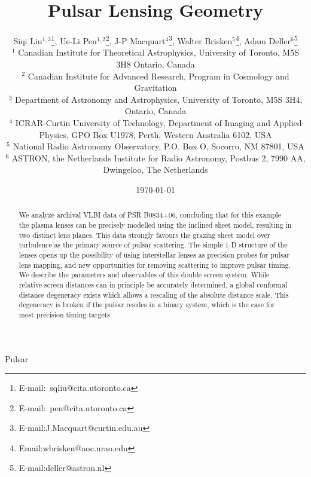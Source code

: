\documentclass[useAMS,usenatbib]{mn2e}
\begin{document}
\title[Lensing Geometry]{
Pulsar Lensing Geometry
}

\author[Liu et al]{Siqi Liu$^{1,3}$\thanks{E-mail:\ sqliu@cita.utoronto.ca}, Ue-Li
  Pen$^{1,2}$\thanks{E-mail:\ pen@cita.utoronto.ca}, J-P Macquart$^{4}$\thanks{E-mail:J.Macquart@curtin.edu.au},
  Walter Brisken$^{5}$\thanks{Email:wbrisken@aoc.nrao.edu}, Adam Deller$^{6}$\thanks{E-mail:deller@astron.nl}\\
 $^1$ Canadian Institute for Theoretical Astrophysics, University of Toronto, M5S 3H8 Ontario, Canada \\
$^2$ Canadian Institute for Advanced Research, Program in Cosmology
and Gravitation\\
$^3$ Department of Astronomy and Astrophysics, University of Toronto, M5S 3H4, Ontario, Canada\\
$^4$ ICRAR-Curtin University of Technology, Department of Imaging and Applied Physics, GPO Box U1978, Perth, Western Australia 6102, USA \\
$^5$ National Radio Astronomy Observatory, P.O. Box O, Socorro, NM 87801, USA\\
$^6$ ASTRON, the Netherlands Institute for Radio Astronomy, Postbus 2, 7990 AA, Dwingeloo, The Netherlands\\
}

\date{\today}

\pagerange{\pageref{firstpage}--\pageref{lastpage}} 

\maketitle
\label{firstpage}
\begin{abstract}
We analyze archival VLBI data of PSR
B0834+06, concluding that for this example the plasma lenses can be
precisely modelled using the \citep{2014MNRAS.442.3338P} inclined sheet model,
resulting in two distinct lens planes.  This data strongly favours the
grazing sheet model over turbulence as the primary source of
pulsar scattering.  The simple 1-D structure of the lenses opens up
the possibility of using interstellar lenses as precision probes for
pulsar lens mapping, and new opportunities for removing scattering to
improve pulsar timing.
We describe the parameters and observables of this double screen
system.  While relative screen distances can in principle be
accurately determined,
a global conformal distance degeneracy exists which allows a rescaling
of the absolute distance scale.  This degeneracy is broken if the
pulsar resides in a binary system, which is the case for most
precision timing targets.

\end{abstract}
\begin{keywords}
Pulsar
\end{keywords}
\end{document}
